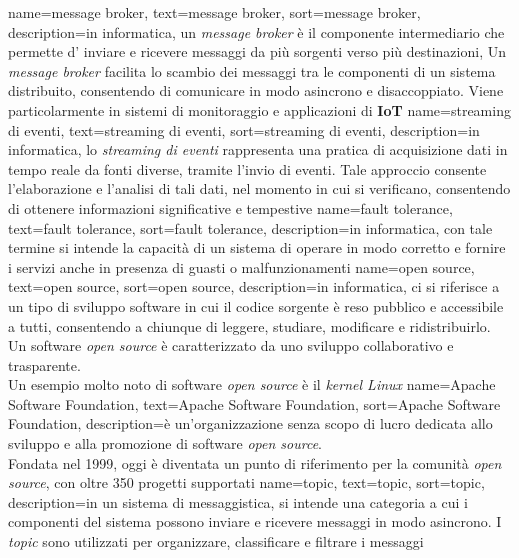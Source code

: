 {
    name={message broker},
    text=message broker,
    sort=message broker,
    description={in informatica, un \textit{message broker} è  il componente intermediario che permette d' inviare e ricevere messaggi da più sorgenti verso più destinazioni,
    Un \textit{message broker} facilita lo scambio dei messaggi 
    tra le componenti di un sistema distribuito, consentendo di comunicare in modo asincrono e disaccoppiato.
    Viene particolarmente in sistemi di monitoraggio e applicazioni di \textbf{IoT}}
}
{
    name={streaming di eventi},
    text=streaming di eventi,
    sort=streaming di eventi,
    description={in informatica, lo \textit{streaming di eventi} rappresenta una pratica di acquisizione dati in tempo reale da fonti diverse, 
    tramite l'invio di eventi. Tale approccio consente l'elaborazione e l'analisi di tali dati, nel momento in cui si verificano,
    consentendo di ottenere informazioni significative e tempestive}
}
{
    name={fault tolerance},
    text=fault tolerance,
    sort=fault tolerance,
    description={in informatica, con tale termine si intende la capacità di un sistema di operare in modo corretto e fornire 
    i servizi anche in presenza di guasti o malfunzionamenti}
}
{
    name={open source},
    text=open source,
    sort=open source,
    description={in informatica, ci si riferisce a un tipo di sviluppo software in cui il codice sorgente è reso pubblico e accessibile a tutti,
    consentendo a chiunque di leggere, studiare, modificare e ridistribuirlo.
    Un software \textit{open source} è caratterizzato da uno sviluppo collaborativo e trasparente.\\
    Un esempio molto noto di software \textit{open source} è il \textit{kernel Linux}}
}
{
    name={Apache Software Foundation},
    text=Apache Software Foundation,
    sort=Apache Software Foundation,
    description={è un'organizzazione senza scopo di lucro dedicata allo sviluppo e alla promozione di software \textit{open source}.\\
    Fondata nel 1999, oggi è diventata un punto di riferimento per la comunità \textit{open source}, con oltre 350 progetti supportati
    }
}
{
    name={topic},
    text=topic,
    sort=topic,
    description={in un sistema di messaggistica, si intende una categoria a cui i componenti del sistema possono inviare e 
    ricevere messaggi in modo asincrono. I \textit{topic} sono utilizzati per organizzare, classificare e filtrare i messaggi
    }
}
